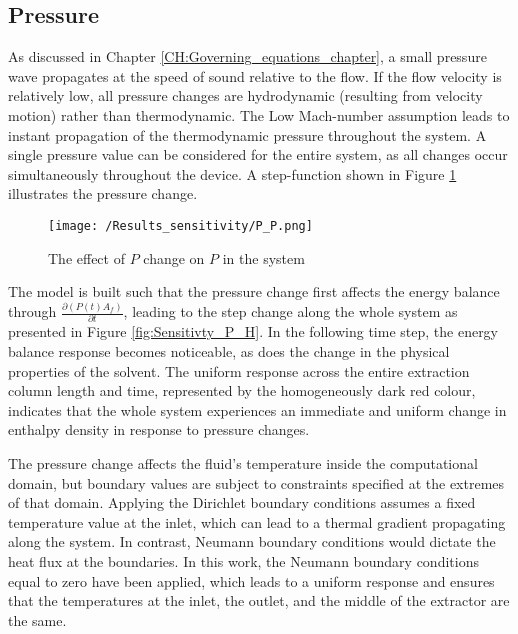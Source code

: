 \documentclass[../Article_Sensitivity_Analsysis.tex]{subfiles}
\begin{document}
	
	\subsection{Pressure}
	
	As discussed in Chapter \ref{CH:Governing_equations_chapter}, a small pressure wave propagates at the speed of sound relative to the flow. If the flow velocity is relatively low, all pressure changes are hydrodynamic (resulting from velocity motion) rather than thermodynamic. The Low Mach-number assumption leads to instant propagation of the thermodynamic pressure throughout the system. A single pressure value can be considered for the entire system, as all changes occur simultaneously throughout the device. A step-function shown in Figure \ref{fig:Sensitivty_P_P} illustrates the pressure change.
	
	\begin{figure}[h!]
		\centering
		\texttt{[image: /Results\_sensitivity/P\_P.png]}
		\caption{The effect of $P$ change on $P$ in the system}
		\label{fig:Sensitivty_P_P}
	\end{figure}
	
	
	The model is built such that the pressure change first affects the energy balance through $\frac{\partial (P(t) A_f)}{\partial t}$, leading to the step change along the whole system as presented in Figure \ref{fig:Sensitivty_P_H}. In the following time step, the energy balance response becomes noticeable, as does the change in the physical properties of the solvent. The uniform response across the entire extraction column length and time, represented by the homogeneously dark red colour, indicates that the whole system experiences an immediate and uniform change in enthalpy density in response to pressure changes. 
	
	The pressure change affects the fluid's temperature inside the computational domain, but boundary values are subject to constraints specified at the extremes of that domain. Applying the Dirichlet boundary conditions assumes a fixed temperature value at the inlet, which can lead to a thermal gradient propagating along the system. In contrast, Neumann boundary conditions would dictate the heat flux at the boundaries. In this work, the Neumann boundary conditions equal to zero have been applied, which leads to a uniform response and ensures that the temperatures at the inlet, the outlet, and the middle of the extractor are the same.
	
\end{document}
